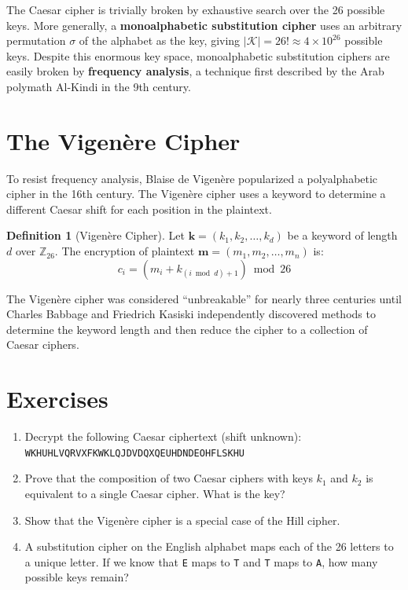 \documentclass[12pt,a4paper,openany]{book}
\theoremstyle{definition}
\newtheorem{definition}{Definition}[chapter]
\theoremstyle{plain}
\begin{document}
The Caesar cipher is trivially broken by exhaustive search over the 26 possible keys. More generally, a \textbf{monoalphabetic substitution cipher} uses an arbitrary permutation $\sigma$ of the alphabet as the key, giving $|\mathcal{K}| = 26! \approx 4 \times 10^{26}$ possible keys. Despite this enormous key space, monoalphabetic substitution ciphers are easily broken by \textbf{frequency analysis}, a technique first described by the Arab polymath Al-Kindi in the 9th century.

\section{The Vigen\`{e}re Cipher}

To resist frequency analysis, Blaise de Vigen\`{e}re popularized a polyalphabetic cipher in the 16th century. The Vigen\`{e}re cipher uses a keyword to determine a different Caesar shift for each position in the plaintext.

\begin{definition}[Vigen\`{e}re Cipher]
Let $\mathbf{k} = (k_1, k_2, \ldots, k_d)$ be a keyword of length $d$ over $\mathbb{Z}_{26}$. The encryption of plaintext $\mathbf{m} = (m_1, m_2, \ldots, m_n)$ is:
\begin{equation}
  c_i = (m_i + k_{(i \bmod d) + 1}) \bmod 26
\end{equation}
\end{definition}

The Vigen\`{e}re cipher was considered ``unbreakable'' for nearly three centuries until Charles Babbage and Friedrich Kasiski independently discovered methods to determine the keyword length and then reduce the cipher to a collection of Caesar ciphers.

\section{Exercises}

\begin{enumerate}[label=\textbf{\thechapter.\arabic*}]
  \item Decrypt the following Caesar ciphertext (shift unknown):\\
  \texttt{WKHUHLVQRVXFKWKLQJDVDQXQEUHDNDEOHFLSKHU}
  \item Prove that the composition of two Caesar ciphers with keys $k_1$ and $k_2$ is equivalent to a single Caesar cipher. What is the key?
  \item Show that the Vigen\`{e}re cipher is a special case of the Hill cipher.
  \item A substitution cipher on the English alphabet maps each of the 26 letters to a unique letter. If we know that \texttt{E} maps to \texttt{T} and \texttt{T} maps to \texttt{A}, how many possible keys remain?
\end{enumerate}
\end{document}
